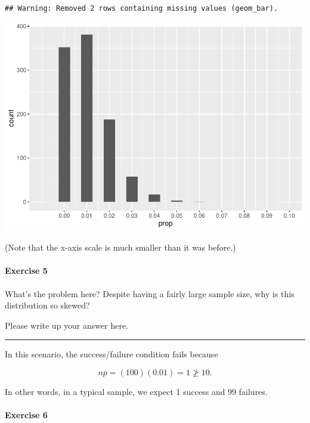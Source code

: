 \documentclass[
]{book}
\begin{document}
\begin{verbatim}
## Warning: Removed 2 rows containing missing values (geom_bar).
\end{verbatim}

\includegraphics{intro_stats_files/figure-latex/unnamed-chunk-373-1.pdf}

(Note that the x-axis scale is much smaller than it was before.)

\hypertarget{exercise-5-6}{%
\paragraph*{Exercise 5}\label{exercise-5-6}}

What's the problem here? Despite having a fairly large sample size, why is this distribution so skewed?

Please write up your answer here.

\begin{center}\rule{0.5\linewidth}{0.5pt}\end{center}

In this scenario, the success/failure condition fails because

\[
np = (100)(0.01) = 1 \ngeq 10.
\]

In other words, in a typical sample, we expect 1 success and 99 failures.

\hypertarget{exercise-6-4}{%
\paragraph*{Exercise 6}\label{exercise-6-4}}
\end{document}
